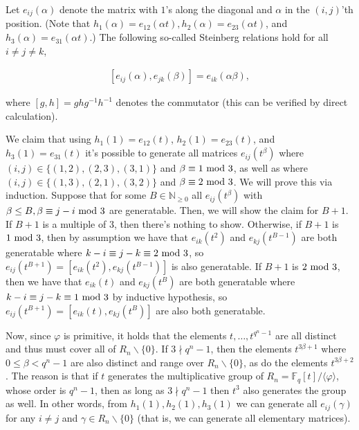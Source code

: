 Let $e_{ij}(\alpha)$ denote the matrix with $1$’s along the diagonal and $\alpha$ in the $(i,j)$’th position. (Note that $h_{1}(\alpha)=e_{12}(\alpha t),h_{2}(\alpha)=e_{23}(\alpha t)$, and $h_{3}(\alpha)=e_{31}(\alpha t)$.) The following so-called Steinberg relations hold for all $i\not=j\not=k$,\par


\[\begin{gathered}
[e_{ij}(\alpha),e_{jk}(\beta)]=e_{ik}(\alpha\beta),
\end{gathered}\]


where $[g,h]=ghg^{-1}h^{-1}$ denotes the commutator (this can be verified by direct calculation).\par




We claim that using $h_{1}(1)=e_{12}(t)$, $h_{2}(1)=e_{23}(t)$, and $h_{3}(1)=e_{31}(t)$ it’s possible to generate all matrices $e_{ij}(t^{\beta})$ where $(i,j)\in\{(1,2),(2,3),(3,1)\}$ and $\beta\equiv 1\nobreak\ \text{mod}\nobreak\ 3$, as well as where $(i,j)\in\{(1,3),(2,1),(3,2)\}$ and $\beta\equiv 2\nobreak\ \text{mod}\nobreak\ 3$. We will prove this via induction. Suppose that for some $B\in\mathbb{N}_{\geq 0}$ all $e_{ij}(t^{\beta})$ with $\beta\leq B,\beta\equiv j-i\nobreak\ \text{mod}\nobreak\ 3$ are generatable. Then, we will show the claim for $B+1$. If $B+1$ is a multiple of $3$, then there’s nothing to show. Otherwise, if $B+1$ is $1\nobreak\ \text{mod}\nobreak\ 3$, then by assumption we have that $e_{ik}(t^{2})$ and $e_{kj}(t^{B-1})$ are both generatable where $k-i\equiv j-k\equiv 2\nobreak\ \text{mod}\nobreak\ 3$, so $e_{ij}(t^{B+1})=[e_{ik}(t^{2}),e_{kj}(t^{B-1})]$ is also generatable. If $B+1$ is $2\nobreak\ \text{mod}\nobreak\ 3$, then we have that $e_{ik}(t)$ and $e_{kj}(t^{B})$ are both generatable where $k-i\equiv j-k\equiv 1\nobreak\ \text{mod}\nobreak\ 3$ by inductive hypothesis, so $e_{ij}(t^{B+1})=[e_{ik}(t),e_{kj}(t^{B})]$ are also both generatable.\par




Now, since $\varphi$ is primitive, it holds that the elements $t,\dots,t^{q^{n}-1}$ are all distinct and thus must cover all of $R_{n}\backslash\{0\}$. If $3\nmid q^{n}-1$, then the elements $t^{3\beta+1}$ where $0\leq\beta<q^{n}-1$ are also distinct and range over $R_{n}\backslash\{0\}$, as do the elements $t^{3\beta+2}$.
The reason is that if $t$ generates the multiplicative group of $R_{n}=\mathbb{F}_{q}[t]/\langle\varphi\rangle$, whose order is $q^{n}-1$, then as long as $3\nmid q^{n}-1$ then $t^{3}$ also generates the group as well.
In other words, from $h_{1}(1),h_{2}(1),h_{3}(1)$ we can generate all $e_{ij}(\gamma)$ for any $i\not=j$ and $\gamma\in R_{n}\backslash\{0\}$ (that is, we can generate all elementary matrices).\par




